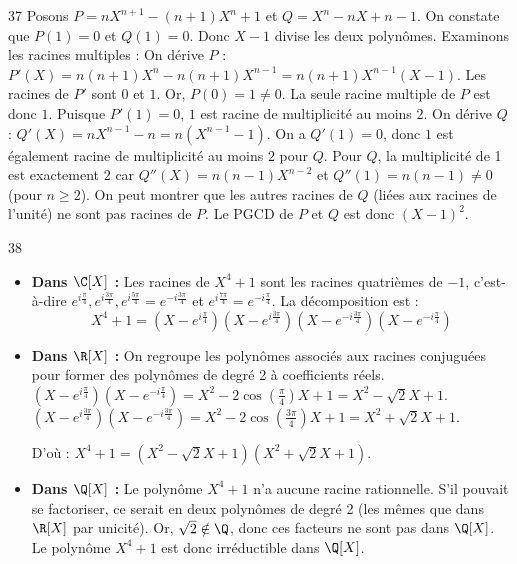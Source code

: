 \begin{correction}{37}
Posons $P = nX^{n+1}-(n+1)X^{n}+1$ et $Q = X^{n}-nX+n-1$.
On constate que $P(1) = 0$ et $Q(1) = 0$. Donc $X-1$ divise les deux polynômes.
Examinons les racines multiples :
On dérive $P$ : $P'(X) = n(n+1)X^n - n(n+1)X^{n-1} = n(n+1)X^{n-1}(X-1)$.
Les racines de $P'$ sont $0$ et $1$. Or, $P(0) = 1 \neq 0$. La seule racine multiple de $P$ est donc $1$. Puisque $P'(1)=0$, $1$ est racine de multiplicité au moins $2$.
On dérive $Q$ : $Q'(X) = nX^{n-1} - n = n(X^{n-1} - 1)$.
On a $Q'(1) = 0$, donc $1$ est également racine de multiplicité au moins $2$ pour $Q$.
Pour $Q$, la multiplicité de 1 est exactement $2$ car $Q''(X) = n(n-1)X^{n-2}$ et $Q''(1) = n(n-1) \neq 0$ (pour $n \ge 2$).
On peut montrer que les autres racines de $Q$ (liées aux racines de l'unité) ne sont pas racines de $P$. 
Le PGCD de $P$ et $Q$ est donc $(X-1)^2$.
\end{correction}

\begin{correction}{38}
\begin{itemize}
 \item \textbf{Dans $\C[X]$ :} Les racines de $X^4+1$ sont les racines quatrièmes de $-1$, c'est-à-dire $e^{i\frac{\pi}{4}}, e^{i\frac{3\pi}{4}}, e^{i\frac{5\pi}{4}} = e^{-i\frac{3\pi}{4}}$ et $e^{i\frac{7\pi}{4}} = e^{-i\frac{\pi}{4}}$. 
 La décomposition est :
 \[X^4+1 = \left(X - e^{i\frac{\pi}{4}}\right)\left(X - e^{i\frac{3\pi}{4}}\right)\left(X - e^{-i\frac{3\pi}{4}}\right)\left(X - e^{-i\frac{\pi}{4}}\right)\]

 \item \textbf{Dans $\R[X]$ :} On regroupe les polynômes associés aux racines conjuguées pour former des polynômes de degré 2 à coefficients réels. 
 $\left(X-e^{i\frac{\pi}{4}}\right)\left(X-e^{-i\frac{\pi}{4}}\right) = X^2 - 2\cos\left(\frac{\pi}{4}\right)X + 1 = X^2 - \sqrt{2}X + 1$. 
 $\left(X-e^{i\frac{3\pi}{4}}\right)\left(X-e^{-i\frac{3\pi}{4}}\right) = X^2 - 2\cos\left(\frac{3\pi}{4}\right)X + 1 = X^2 + \sqrt{2}X + 1$. 

 D'où : $X^4+1 = (X^2-\sqrt{2}X+1)(X^2+\sqrt{2}X+1)$. 

 \item \textbf{Dans $\Q[X]$ :} Le polynôme $X^4+1$ n'a aucune racine rationnelle. S'il pouvait se factoriser, ce serait en deux polynômes de degré 2 (les mêmes que dans $\R[X]$ par unicité). 
 Or, $\sqrt{2} \notin \Q$, donc ces facteurs ne sont pas dans $\Q[X]$. 
 Le polynôme $X^4+1$ est donc irréductible dans $\Q[X]$. 
\end{itemize}
\end{correction}

